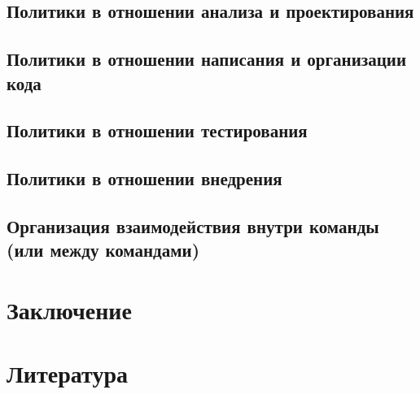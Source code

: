 \documentclass[a4paper]{article}
\begin{document}
\subsection{Политики в отношении анализа и проектирования}


\subsection{Политики в отношении написания и организации кода}


\subsection{Политики в отношении тестирования}


\subsection{Политики в отношении внедрения}


\subsection{Организация взаимодействия внутри команды (или между командами)}


\newpage

\section*{Заключение}


\newpage

\section*{Литература}
\printbibliography[heading=none]
\end{document}

